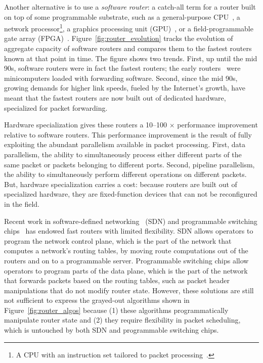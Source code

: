 Another alternative is to use a \textit{software router}: a catch-all term for
a router built on top of some programmable substrate, such as a general-purpose
CPU~\cite{click, routebricks}, a network processor\footnote{A CPU with an
instruction set tailored to packet processing~\cite{ixp4xx, ixp2800}.}, a
graphics processing unit (GPU)~\cite{packetshader}, or a field-programmable gate array (FPGA)~\cite{netfpga}.
Figure~\ref{fig:router_evolution} tracks the evolution of aggregate capacity of
software routers and compares them to the fastest routers known at that point
in time. The figure shows two trends. First, up until the mid 90s, software
routers were in fact the fastest routers; the early routers~\cite{imp} were
minicomputers loaded with forwarding software. Second, since the mid 90s,
growing demands for higher link speeds, fueled by the Internet's growth, have
meant that the fastest routers are now built out of dedicated hardware,
specialized for packet forwarding.

Hardware specialization gives these routers a 10--100 $\times$ performance
improvement relative to software routers.  This performance improvement is the
result of fully exploiting the abundant parallelism available in packet
processing. First, data parallelism, the ability to simultaneously process
either different parts of the same packet or packets belonging to different
ports. Second, pipeline parallelism, the ability to simultaneously perform
different operations on different packets. But, hardware specialization carries
a cost: because routers are built out of specialized hardware, they are
fixed-function devices that can not be reconfigured in the field.

Recent work in software-defined networking~\cite{openflow} (SDN) and
programmable switching chips~\cite{rmt, xpliant, flexpipe} has endowed fast
routers with limited flexibility. SDN allows operators to program the network
control plane, which is the part of the network that computes a network's
routing tables, by moving route computations out of the routers and on to a
programmable server. Programmable switching chips allow operators to program
parts of the data plane, which is the part of the network that forwards packets
based on the routing tables, such as packet header manipulations that do not
modify router state.  However, these solutions are still not sufficient to
express the grayed-out algorithms shown in Figure~\ref{fig:router_algos}
because (1) these algorithms programmatically manipulate router state and (2)
they require flexibility in packet scheduling, which is untouched by both SDN
and programmable switching chips.

